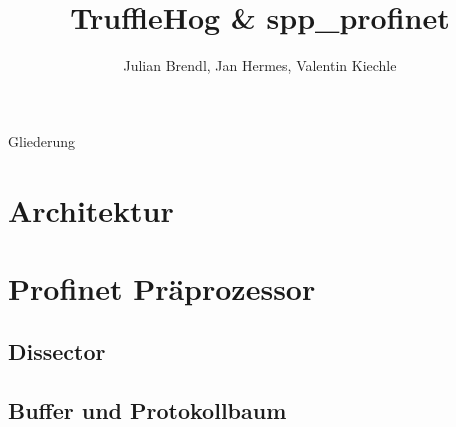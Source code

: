 \documentclass[18pt]{beamer}
\title[TruffleHog \& spp\_profinet]{TruffleHog \& spp\_profinet}
\author{Julian Brendl, Jan Hermes, Valentin Kiechle}
\institute{Fraunhofer IOSB}
\begin{document}

\begin{frame}
	\titlepage
\end{frame}

\begin{frame}{Gliederung}
	\tableofcontents
\end{frame}

%	

\section{Architektur}
	
	
	
	
	
	
	
	
	
	
	
	
	
	
	
	
	
	
	
	

\section{Profinet Präprozessor}
	\subsection{Dissector}
		
		
		
		
		
		
		
	\subsection{Buffer und Protokollbaum}
		
\end{document}
